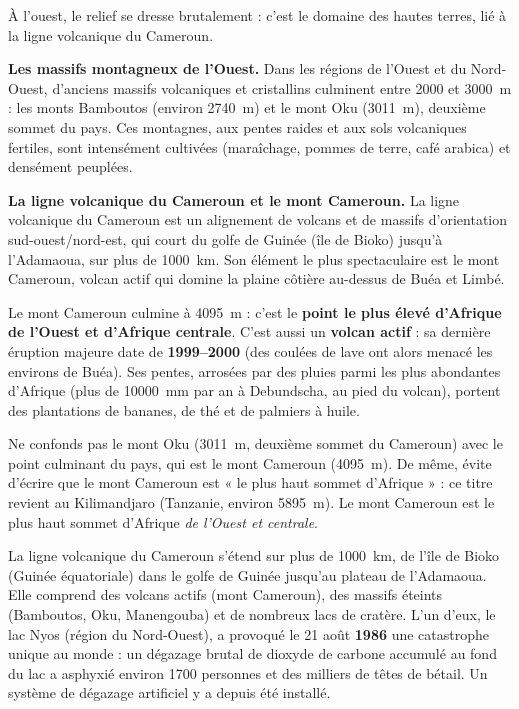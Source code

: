 \documentclass[11pt]{article}
\newcommand{\cle}[1]{{\popxbold\color{popdark}#1}}
\newcounter{popsec}
\newcounter{popsub}
\newcommand{\courssub}[1]{%
  \stepcounter{popsub}%
  \par\vspace{9pt}\noindent{\popxbold\fontsize{11.5}{13}\selectfont\color{popink}{\color{poporange}\thepopsec.\thepopsub}\hspace{6pt}#1}\par\nopagebreak\vspace{4pt}
}
\begin{document}
\courssub{Les hautes terres de l'Ouest : le toit du pays}

À l'ouest, le relief se dresse brutalement : c'est le domaine des \cle{hautes terres}, lié à la \cle{ligne volcanique du Cameroun}.

\textbf{Les massifs montagneux de l'Ouest.} Dans les régions de l'Ouest et du Nord-Ouest, d'anciens massifs volcaniques et cristallins culminent entre \num{2000} et \SI{3000}{m} : les \cle{monts Bamboutos} (environ \SI{2740}{m}) et le \cle{mont Oku} (\SI{3011}{m}), deuxième sommet du pays. Ces montagnes, aux pentes raides et aux sols volcaniques fertiles, sont intensément cultivées (maraîchage, pommes de terre, café arabica) et densément peuplées.

\textbf{La ligne volcanique du Cameroun et le mont Cameroun.} La \cle{ligne volcanique du Cameroun} est un alignement de volcans et de massifs d'orientation sud-ouest/nord-est, qui court du golfe de Guinée (île de Bioko) jusqu'à l'Adamaoua, sur plus de \SI{1000}{km}. Son élément le plus spectaculaire est le \cle{mont Cameroun}, volcan actif qui domine la plaine côtière au-dessus de Buéa et Limbé.

\begin{exemplebox}
Le \cle{mont Cameroun} culmine à \SI{4095}{m} : c'est le \textbf{point le plus élevé d'Afrique de l'Ouest et d'Afrique centrale}. C'est aussi un \textbf{volcan actif} : sa dernière éruption majeure date de \textbf{1999--2000} (des coulées de lave ont alors menacé les environs de Buéa). Ses pentes, arrosées par des pluies parmi les plus abondantes d'Afrique (plus de \SI{10000}{mm} par an à Debundscha, au pied du volcan), portent des plantations de bananes, de thé et de palmiers à huile.
\end{exemplebox}

\begin{attention}
Ne confonds pas le \cle{mont Oku} (\SI{3011}{m}, deuxième sommet du Cameroun) avec le \cle{point culminant} du pays, qui est le \cle{mont Cameroun} (\SI{4095}{m}). De même, évite d'écrire que le mont Cameroun est « le plus haut sommet d'Afrique » : ce titre revient au Kilimandjaro (Tanzanie, environ \SI{5895}{m}). Le mont Cameroun est le plus haut sommet d'Afrique \emph{de l'Ouest et centrale}.
\end{attention}

\begin{savaistu}
La ligne volcanique du Cameroun s'étend sur plus de \SI{1000}{km}, de l'île de \cle{Bioko} (Guinée équatoriale) dans le golfe de Guinée jusqu'au plateau de l'Adamaoua. Elle comprend des volcans actifs (mont Cameroun), des massifs éteints (Bamboutos, Oku, Manengouba) et de nombreux \cle{lacs de cratère}. L'un d'eux, le \cle{lac Nyos} (région du Nord-Ouest), a provoqué le 21 août \textbf{1986} une catastrophe unique au monde : un dégazage brutal de dioxyde de carbone accumulé au fond du lac a asphyxié environ \num{1700} personnes et des milliers de têtes de bétail. Un système de dégazage artificiel y a depuis été installé.
\end{savaistu}
\end{document}
